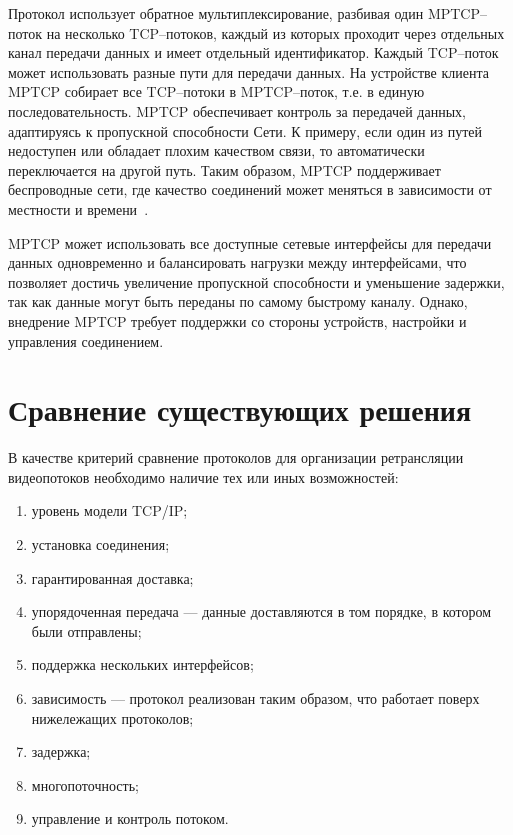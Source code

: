 Протокол использует обратное мультиплексирование, разбивая один \newline MPTCP--поток на несколько TCP--потоков, каждый из которых проходит через отдельных канал передачи данных и имеет отдельный идентификатор. Каждый TCP--поток может использовать разные пути для передачи данных. 
На устройстве клиента MPTCP собирает все TCP--потоки в MPTCP--поток, т.е. в единую последовательность.
MPTCP обеспечивает контроль за передачей данных, адаптируясь к пропускной способности Сети.
К примеру, если один из путей недоступен или обладает плохим качеством связи, то автоматически переключается на другой путь.
Таким образом, MPTCP поддерживает беспроводные сети, где качество соединений может меняться в зависимости от местности и времени~\cite{rfc-mptcp-6824, rfc-mptcp-8684}. 

\clearpage

MPTCP может использовать все доступные сетевые интерфейсы для передачи данных одновременно и балансировать нагрузки между интерфейсами, что позволяет достичь увеличение пропускной способности и уменьшение задержки, так как данные могут быть переданы по самому быстрому каналу.
Однако, внедрение MPTCP требует поддержки со стороны устройств, настройки и управления соединением.

\chapter{Сравнение существующих решения}

В качестве критерий сравнение протоколов для организации ретрансляции видеопотоков необходимо наличие тех или иных возможностей:
\begin{enumerate}
	\item уровень модели TCP/IP;
	\item установка соединения;
	\item гарантированная доставка;
	\item упорядоченная передача --- данные доставляются в том порядке, в котором были отправлены;
	\item поддержка нескольких интерфейсов;
	\item зависимость --- протокол реализован таким образом, что работает поверх нижележащих протоколов;
	\item задержка;
	\item многопоточность;
	\item управление и контроль потоком.
\end{enumerate}

